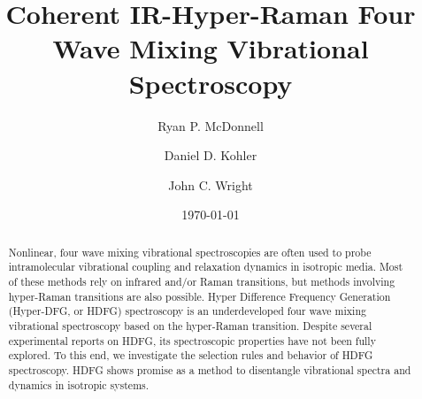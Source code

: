 \documentclass[aip, jcp, reprint, onecolumn]{revtex4-2}
\begin{document}
\title{Coherent IR-Hyper-Raman Four Wave Mixing Vibrational Spectroscopy}


\author{Ryan P. McDonnell} 
\author{Daniel D. Kohler}
\author{John C. Wright} 


\date{\today}

\begin{abstract}
Nonlinear, four wave mixing vibrational spectroscopies are often used to probe intramolecular vibrational coupling and relaxation dynamics in isotropic media.
Most of these methods rely on infrared and/or Raman transitions, but methods involving hyper-Raman transitions are also possible. 
Hyper Difference Frequency Generation (Hyper-DFG, or HDFG) spectroscopy is an underdeveloped four wave mixing vibrational spectroscopy based on the hyper-Raman transition. 
Despite several experimental reports on HDFG, its spectroscopic properties have not been fully explored.  %
To this end, we investigate the selection rules and behavior of HDFG spectroscopy.
HDFG shows promise as a method to disentangle vibrational spectra and dynamics in isotropic systems.

\end{abstract}
\end{document}
